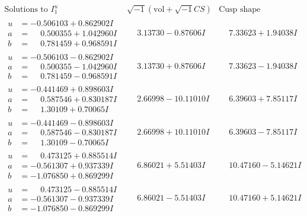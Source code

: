 \documentclass[1p]{elsarticle_modified}
\theoremstyle{definition}
\newcommand{\I}{\sqrt{-1}}
\begin{document}
$$\begin{array}{c|c|c}  
\text{Solutions to }I^u_{1}& \I (\text{vol} + \sqrt{-1}CS) & \text{Cusp shape}\\
 \hline 
\begin{aligned}
u &= -0.506103 + 0.862902 I \\
a &= \phantom{-}0.500355 + 1.042960 I \\
b &= \phantom{-}0.781459 + 0.968591 I\end{aligned}
 & \phantom{-}3.13730 - 0.87606 I & \phantom{-}7.33623 + 1.94038 I \\ \hline\begin{aligned}
u &= -0.506103 - 0.862902 I \\
a &= \phantom{-}0.500355 - 1.042960 I \\
b &= \phantom{-}0.781459 - 0.968591 I\end{aligned}
 & \phantom{-}3.13730 + 0.87606 I & \phantom{-}7.33623 - 1.94038 I \\ \hline\begin{aligned}
u &= -0.441469 + 0.898603 I \\
a &= \phantom{-}0.587546 + 0.830187 I \\
b &= \phantom{-}1.30109 + 0.70065 I\end{aligned}
 & \phantom{-}2.66998 - 10.11010 I & \phantom{-}6.39603 + 7.85117 I \\ \hline\begin{aligned}
u &= -0.441469 - 0.898603 I \\
a &= \phantom{-}0.587546 - 0.830187 I \\
b &= \phantom{-}1.30109 - 0.70065 I\end{aligned}
 & \phantom{-}2.66998 + 10.11010 I & \phantom{-}6.39603 - 7.85117 I \\ \hline\begin{aligned}
u &= \phantom{-}0.473125 + 0.885514 I \\
a &= -0.561307 + 0.937339 I \\
b &= -1.076850 + 0.869299 I\end{aligned}
 & \phantom{-}6.86021 + 5.51403 I & \phantom{-}10.47160 - 5.14621 I \\ \hline\begin{aligned}
u &= \phantom{-}0.473125 - 0.885514 I \\
a &= -0.561307 - 0.937339 I \\
b &= -1.076850 - 0.869299 I\end{aligned}
 & \phantom{-}6.86021 - 5.51403 I & \phantom{-}10.47160 + 5.14621 I \\ \hline\begin{aligned}

\end{aligned}
\end{array}$$
\end{document}
